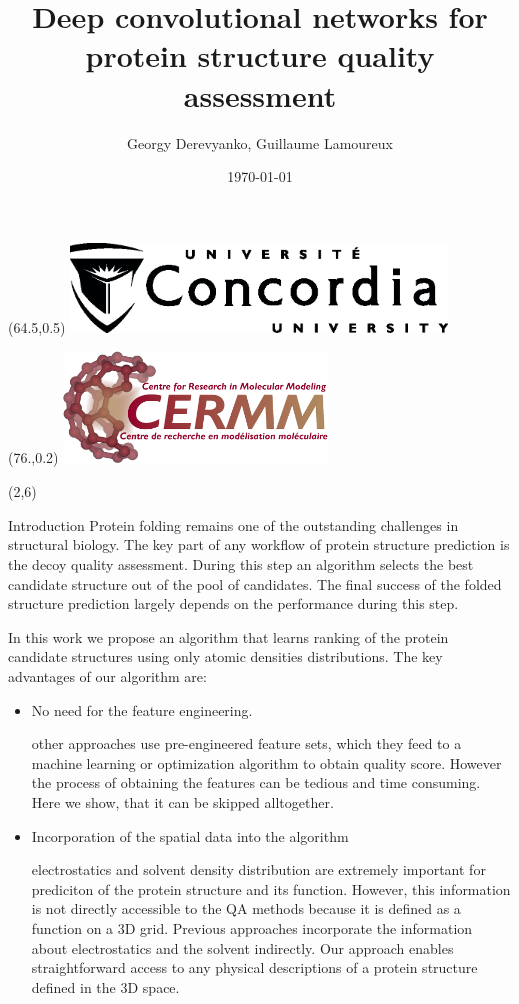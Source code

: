 \documentclass[final, unknownkeysallowed]{beamer}
\title{Deep convolutional networks for protein structure quality assessment}
\author{Georgy Derevyanko, Guillaume Lamoureux}
\institute[CLS]{Department of Chemistry and Biochemistry and Centre for Research in Molecular Modeling (CERMM), Concordia University, Montréal, Canada}
\date{\today}
\begin{document}
\begin{frame}{}

\begin{textblock}{6}(64.5,0.5)
\includegraphics[width=10.0cm]{Logo/ConULogo_K}
\end{textblock}
\begin{textblock}{6}(76.,0.2)
\includegraphics[width=7.0cm]{Logo/CERMM_transparent.png}
\end{textblock}



\begin{textblock}{39.0}(2,6)
\begin{block}{Introduction}
Protein folding remains one of the outstanding challenges in structural biology. 
The key part of any workflow of protein structure prediction is the decoy quality assessment. 
During this step an algorithm selects the best candidate structure out of the pool of candidates. The final 
success of the folded structure prediction largely depends on the performance during this step.

In this work we propose an algorithm that learns ranking of the protein candidate structures using 
only atomic densities distributions. The key advantages of our algorithm are:
\begin{itemize}
\item No need for the feature engineering.

other approaches use pre-engineered feature sets, which they feed to a machine learning or optimization 
algorithm to obtain quality score. However the process of obtaining the features can be tedious and time 
consuming. Here we show, that it can be skipped alltogether.

\item Incorporation of the spatial data into the algorithm

electrostatics and solvent density distribution are extremely important for prediciton of the protein 
structure and its function. However, this information is not directly accessible to the QA methods 
because it is defined as a function on a 3D grid. Previous approaches incorporate the information 
about electrostatics and the solvent indirectly. Our approach enables straightforward access to any 
physical descriptions of a protein structure defined in the 3D space.
\end{itemize}
\end{block}


\end{textblock}
\end{frame}
\end{document}
